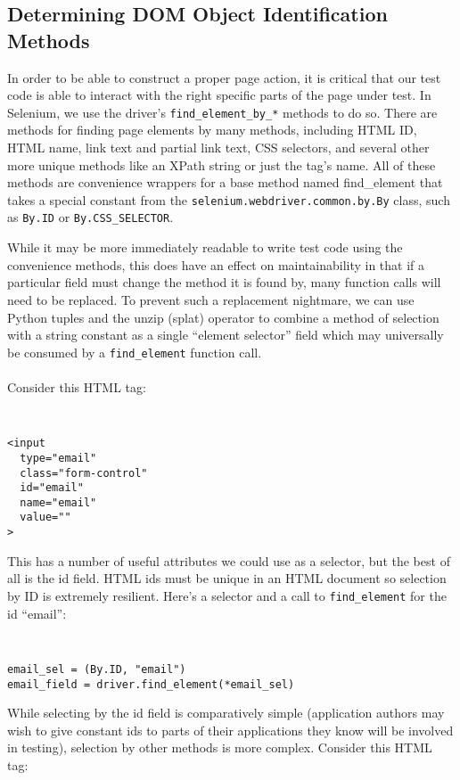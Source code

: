 \subsection{Determining DOM Object Identification Methods}
In order to be able to construct a proper page action, it is critical that our test code is able to interact with the right specific parts of the page under test. In Selenium, we use the driver's \texttt{find\_element\_by\_*} methods to do so. There are methods for finding page elements by many methods, including HTML ID, HTML name, link text and partial link text, CSS selectors, and several other more unique methods like an XPath string or just the tag's name. All of these methods are convenience wrappers for a base method named find\_element that takes a special constant from the \texttt{selenium.webdriver.common.by.By} class, such as \texttt{By.ID} or \texttt{By.CSS\_SELECTOR}.

While it may be more immediately readable to write test code using the convenience methods, this does have an effect on maintainability in that if a particular field must change the method it is found by, many function calls will need to be replaced.\citep{gupta2003dom} To prevent such a replacement nightmare, we can use Python tuples and the unzip (splat) operator to combine a method of selection with a string constant as a single ``element selector'' field which may universally be consumed by a \texttt{find\_element} function call.
\\\\
Consider this HTML tag:

{\tt
\begin{verbatim}
<input
  type="email"
  class="form-control"
  id="email"
  name="email"
  value=""
>
\end{verbatim}
}

This has a number of useful attributes we could use as a selector, but the best of all is the id field. HTML ids must be unique in an HTML document \citep{HTMLStan99} so selection by ID is extremely resilient. Here's a selector and a call to \texttt{find\_element} for the id ``email'':

{\tt
\begin{verbatim}
email_sel = (By.ID, "email")
email_field = driver.find_element(*email_sel)
\end{verbatim}
}

While selecting by the id field is comparatively simple (application authors may wish to give constant ids to parts of their applications they know will be involved in testing)\citep{DOMStand78}, selection by other methods is more complex. Consider this HTML tag:

